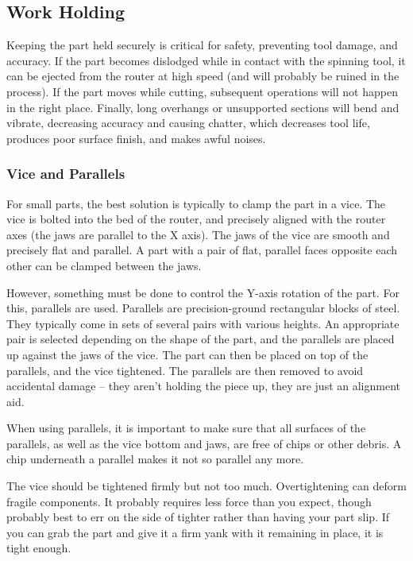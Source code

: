 \documentclass[a4paper,11pt]{article}
\begin{document}
\subsection{Work Holding}
Keeping the part held securely is critical for safety, preventing tool damage, and accuracy. If the part becomes dislodged while in contact with the spinning tool, it can be ejected from the router at high speed (and will probably be ruined in the process). If the part moves while cutting, subsequent operations will not happen in the right place. Finally, long overhangs or unsupported sections will bend and vibrate, decreasing accuracy and causing chatter, which decreases tool life, produces poor surface finish, and makes awful noises.

\subsubsection{Vice and Parallels}
For small parts, the best solution is typically to clamp the part in a vice. The vice is bolted into the bed of the router, and precisely aligned with the router axes (the jaws are parallel to the X axis). The jaws of the vice are smooth and precisely flat and parallel. A part with a pair of flat, parallel faces opposite each other can be clamped between the jaws. 

However, something must be done to control the Y-axis rotation of the part. For this, parallels are used. Parallels are precision-ground rectangular blocks of steel. They typically come in sets of several pairs with various heights. An appropriate pair is selected depending on the shape of the part, and the parallels are placed up against the jaws of the vice. The part can then be placed on top of the parallels, and the vice tightened. The parallels are then removed to avoid accidental damage -- they aren't holding the piece up, they are just an alignment aid. 

When using parallels, it is important to make sure that all surfaces of the parallels, as well as the vice bottom and jaws, are free of chips or other debris. A chip underneath a parallel makes it not so parallel any more.

The vice should be tightened firmly but not too much. Overtightening can deform fragile components. It probably requires less force than you expect, though probably best to err on the side of tighter rather than having your part slip. If you can grab the part and give it a firm yank with it remaining in place, it is tight enough.
\end{document}

